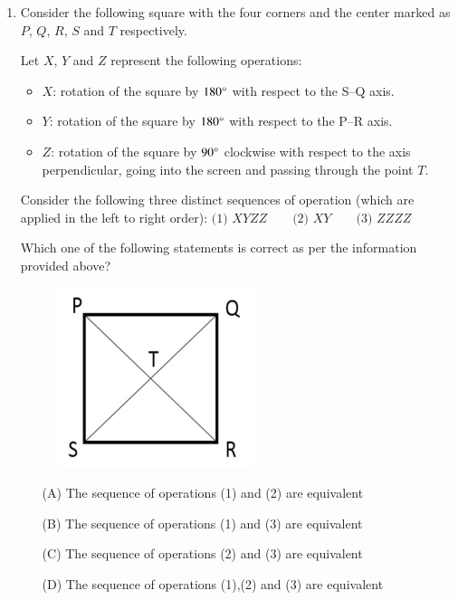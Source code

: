 \documentclass[journal,12pt,onecolumn]{IEEEtran}
\theoremstyle{remark}
\begin{document}
\begin{enumerate}
\begin{multicols}{4}
\end{multicols}

\hfill(GATE NM 2022)








\item  Consider the following square with the four corners and the center marked as $P$, $Q$, $R$, $S$ and $T$ respectively.  

Let $X$, $Y$ and $Z$ represent the following operations:  
\begin{itemize}
	\item $X$: rotation of the square by $180{\degree}$ with respect to the S--Q axis.
	\item $Y$: rotation of the square by $180{\degree}$ with respect to the P--R axis.
	\item $Z$: rotation of the square by $90{\degree}$ clockwise with respect to the axis perpendicular, going into the screen and passing through the point $T$.
\end{itemize}

Consider the following three distinct sequences of operation (which are applied in the left to right order):  
$
\text{(1) } XYZZ \quad\quad \text{(2) } XY \quad\quad \text{(3) } ZZZZ
$

Which one of the following statements is correct as per the information provided above?  


\begin{figure}[h]
	\centering
	\includegraphics[width=0.2\columnwidth]{fig3}
	\caption{}
	\label{fig:placeholder}
\end{figure}

\begin{enumerate}
    \item[(A)] The sequence of operations (1) and (2) are equivalent
    \item[(B)] The sequence of operations (1) and (3) are equivalent
    \item[(C)] The sequence of operations (2) and (3) are equivalent
    \item[(D)] The sequence of operations (1),(2) and (3) are equivalent
\end{enumerate}


\end{enumerate}
\end{document}
